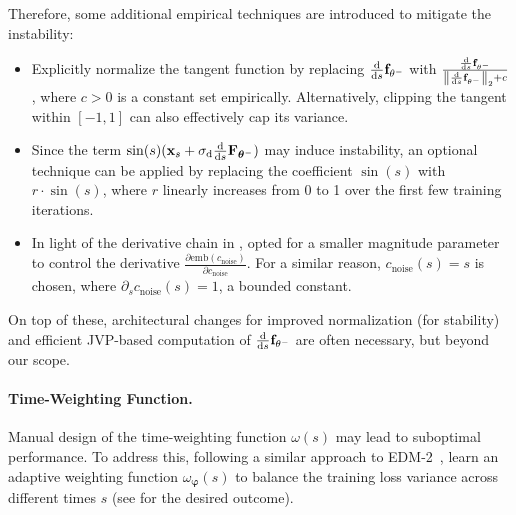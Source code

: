 Therefore, some additional empirical techniques are introduced to mitigate the instability:
\begin{itemize}
    \item {} Explicitly normalize the tangent function by replacing $\frac{\mathop{}\!\mathrm{d} }{\mathop{}\!\mathrm{d} s}{\mathbf{f}}_{\theta^-}$ with
    $    \frac{\frac{\mathop{}\!\mathrm{d} }{\mathop{}\!\mathrm{d} s} {\mathbf{f}}_{\theta^-}}{\left\| \frac{\mathop{}\!\mathrm{d} }{\mathop{}\!\mathrm{d} s} {\mathbf{f}}_{\theta^-} \right\|_2 + c}$,
    where $c>0$ is a constant set empirically. Alternatively, clipping the tangent within $[-1, 1]$ can also effectively cap its variance.
    \item {} Since the term $\sin(s)({\mathbf{x}}_s + \sigma_{\mathrm{d}} \frac{\mathop{}\!\mathrm{d} }{\mathop{}\!\mathrm{d} s}{\mathbf{F}}_{\bm{\theta}^-})$ may induce instability, an optional technique can be applied by replacing the coefficient $\sin(s)$ with $r \cdot \sin(s)$, where $r$ linearly increases from 0 to 1 over the first few training iterations.
    \item {} In light of the derivative chain in , \citet{lu2024simplifying} opted for a smaller magnitude parameter to control the derivative $\frac{\partial \text{emb}(c_{\mathrm{noise}})}{\partial c_{\mathrm{noise}}}$. For a similar reason, $c_{\mathrm{noise}}(s) = s$ is chosen, where $\partial_s c_{\mathrm{noise}}(s)=1$, a bounded constant.
\end{itemize}
On top of these, architectural changes for improved normalization (for stability) and efficient JVP-based computation of $\frac{\mathop{}\!\mathrm{d}}{\mathop{}\!\mathrm{d} s}{\mathbf{f}}_{\theta^-}$ are often necessary, but beyond our scope.

\paragraph{Time-Weighting Function.}
Manual design of the time-weighting function $\omega(s)$ may lead to suboptimal performance. To address this, following a similar approach to EDM-2~\citep{karras2024analyzing}, \citet{lu2024simplifying}  learn an adaptive weighting function $\omega_{\bm{\varphi}}(s)$ to balance the training loss variance across different times $s$ (see  for the desired outcome). 

